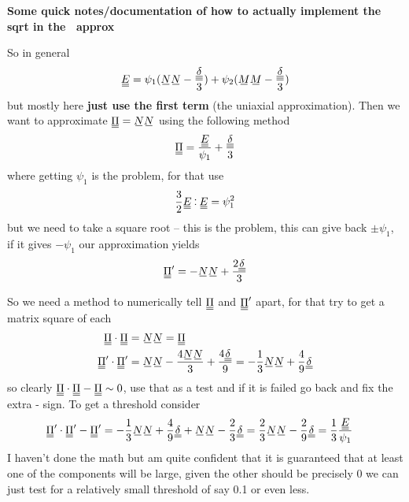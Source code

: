 \documentclass[11pt]{article}
\begin{document}
\begin{center}
    \LARGE
    \textbf{Some quick notes/documentation of how to actually implement the sqrt in the \PP\ approx}
\end{center}
\vspace{1em}

So in general
\begin{equation}
    \du{E} = \psi_1 (\su{N}\su{N} - \frac{\du{\delta}}{3}) + \psi_2 (\su{M}\su{M} - \frac{\du{\delta}}{3})
\end{equation}
but mostly here \textbf{just use the first term} (the uniaxial approximation).
Then we want to approximate $\du{\Pi} = \su{N}\su{N}$ using the following method
\begin{equation}
    \du{\Pi} = \frac{\du{E}}{\psi_1} + \frac{\du{\delta}}{3}
\end{equation}
where getting $\psi_1$ is the problem, for that use
\begin{equation}
    \frac{3}{2} \du{E} \cddot \du{E} = \psi_1^2
\end{equation}
but we need to take a square root -- this is the problem, this can give back $\pm \psi_1$, if it gives $-\psi_1$ our approximation yields
\begin{equation}
    \du{\Pi}' = -\su{N}\su{N} + \frac{2\du{\delta}}{3}
\end{equation}

So we need a method to numerically tell $\du{\Pi}$ and $\du{\Pi}'$ apart, for that try to get a matrix square of each
\begin{align}
    \du{\Pi} \cdot \du{\Pi} &= \su{N}\su{N} = \du{\Pi} \\
    \du{\Pi}' \cdot \du{\Pi}' &= \su{N}\su{N} - \frac{4\su{N}\su{N}}{3} + \frac{4\du{\delta}}{9} = -\frac{1}{3}\su{N}\su{N} + \frac{4}{9}\du{\delta}
\end{align}
so clearly $\du{\Pi} \cdot \du{\Pi} - \du{\Pi} \sim 0$, use that as a test and if it is failed go back and fix the extra - sign.
To get a threshold consider
\begin{align}
    \du{\Pi}' \cdot \du{\Pi}' - \du{\Pi}' &= -\frac{1}{3}\su{N}\su{N} + \frac{4}{9}\du{\delta} + \su{N}\su{N} - \frac{2}{3}\du{\delta} = \frac{2}{3}\su{N}\su{N} - \frac{2}{9}\du{\delta} = \frac{1}{3} \frac{\du{E}}{\psi_1}
\end{align}
I haven't done the math but am quite confident that it is guaranteed that at least one of the components will be large, given the other should be precisely 0 we can just test for a relatively small threshold of say 0.1 or even less.
\end{document}
